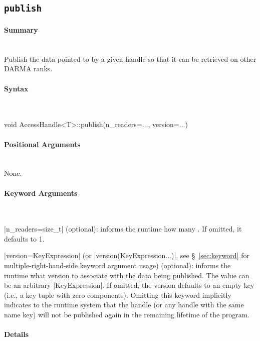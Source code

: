 \subsection{\texttt{publish}}
\label{ssec:api_fe_publish}

\paragraph{Summary} \mbox{}\\
Publish the data pointed to by a given handle so that it can be retrieved on 
other DARMA ranks.

\paragraph{Syntax} \mbox{}\\
\begin{CppCode}
void
AccessHandle<T>::publish(n_readers=..., version=...)
\end{CppCode}

\paragraph{Positional Arguments} \mbox{}\\
None.

\paragraph{Keyword Arguments} \mbox{}\\
\begin{compactitem}
\item |n_readers=size_t| (optional): informs the runtime how many . If
omitted, it defaults to 1.
\item |version=KeyExpression| (or |version(KeyExpression...)|,
see \S~\ref{sec:keyword} for multiple-right-hand-side keyword argument usage)
(optional):
informs the runtime what version to associate with the data being published. 
The value can be an arbitrary |KeyExpression|.
If omitted, the version defaults to an empty key (i.e., a key tuple with zero 
components).  Omitting this keyword implicitly indicates to the runtime system
that the handle (or any handle with the same name key) will not be published
again in the remaining lifetime of the program.
\end{compactitem}

\paragraph{Details} \mbox{}\\

